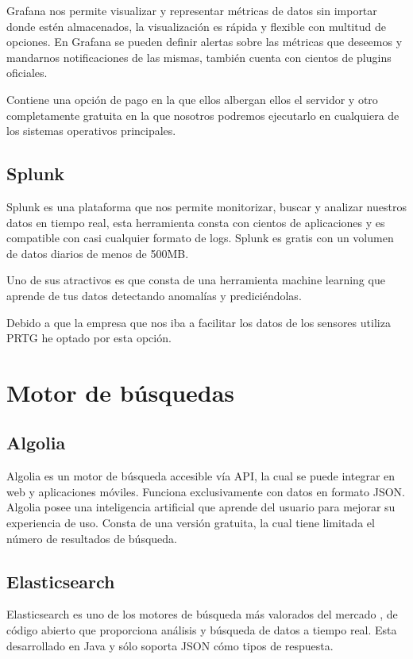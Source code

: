 Grafana nos permite visualizar y representar métricas de datos sin importar donde estén almacenados, la visualización es rápida y flexible con multitud de opciones. En Grafana se pueden definir alertas sobre las métricas que deseemos y mandarnos notificaciones de las mismas, también cuenta con cientos de plugins oficiales. 

Contiene una opción de pago en la que ellos albergan ellos el servidor y otro completamente gratuita en la que nosotros podremos ejecutarlo en cualquiera de los sistemas operativos principales.\cite{pagina:Grafana}
\subsection{Splunk}
Splunk es una plataforma que nos permite monitorizar, buscar y analizar nuestros datos en tiempo real, esta herramienta consta con cientos de aplicaciones y es compatible con casi cualquier formato de logs. Splunk es gratis con un volumen de datos diarios de menos de 500MB. \cite{pagina:Splunk}

Uno de sus atractivos es que consta de una herramienta machine learning que aprende de tus datos detectando anomalías y prediciéndolas.


Debido a que la empresa que nos iba a facilitar los datos de los sensores utiliza PRTG he optado por esta opción.

\section{Motor de búsquedas}

\subsection{Algolia}
Algolia es un motor de búsqueda accesible vía API, la cual se puede integrar en web y aplicaciones móviles. Funciona exclusivamente con datos en formato JSON. Algolia posee una inteligencia artificial que aprende del usuario para mejorar su experiencia de uso. Consta de una versión gratuita, la cual tiene limitada el número de resultados de búsqueda.\cite{pagina:Algolia}

\subsection{Elasticsearch}
Elasticsearch es uno de los motores de búsqueda más valorados del mercado\cite{ranking:DB-Engines} , de código abierto que proporciona análisis y búsqueda de datos a tiempo real. Esta desarrollado en Java y sólo soporta JSON cómo tipos de respuesta.

